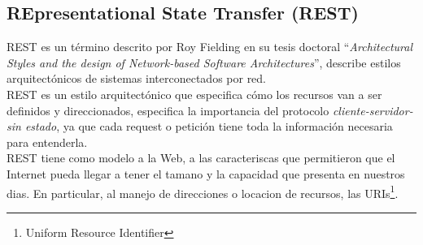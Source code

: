 


%


\subsection{REpresentational State Transfer (REST)} %
\label{sub:rest}

%



  REST es un término descrito por Roy Fielding en su tesis doctoral ``\emph{Architectural Styles and the design of Network-based Software Architectures}''\cite{web6}, describe estilos arquitectónicos de sistemas interconectados por red.\\

  REST es un estilo arquitectónico que especifica cómo los recursos van a ser definidos y direccionados, especifica la importancia del protocolo \emph{cliente-servidor-sin estado}, ya que cada request o petición tiene toda la información necesaria para entenderla.\\

  REST tiene como modelo a la Web, a las caracteriscas que permitieron que el Internet pueda llegar a tener el tamano y la capacidad que presenta en nuestros dias. En particular, al manejo de direcciones o locacion de recursos, las URIs\footnote{Uniform Resource Identifier}. \cite{uri}

